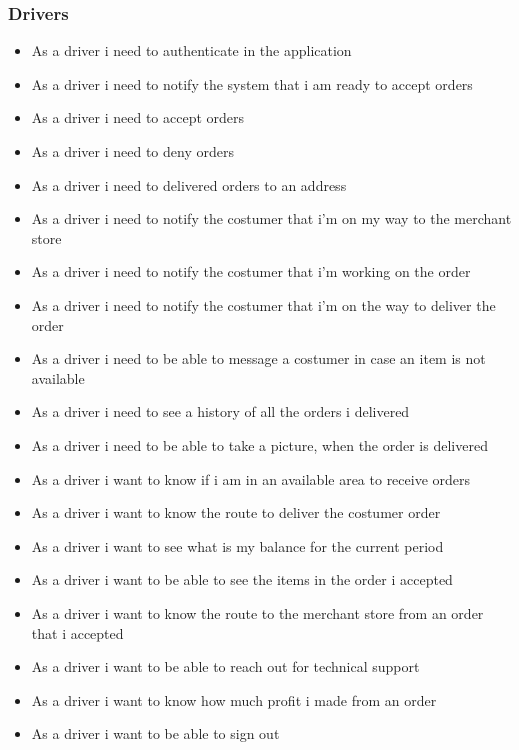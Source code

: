 \subsubsection{Drivers}
\begin{itemize}
    \item As a driver i need to authenticate in the application
    \item As a driver i need to notify the system that i am ready to 
    accept orders
    \item As a driver i need to accept orders
    \item As a driver i need to deny orders
    \item As a driver i need to delivered orders to an address
    \item As a driver i need to notify the costumer that i’m on my way to the 
    merchant store
    \item As a driver i need to notify the costumer that i’m working on the 
    order
    \item As a driver i need to notify the costumer that i’m on the way to 
    deliver the order
    \item As a driver i need to be able to message a costumer in case an 
    item is not available
    \item As a driver i need to see a history of all the orders i delivered
    \item As a driver i need to be able to take a picture, when the order is 
    delivered
    \item As a driver i want to know if i am in an available area to receive 
    orders
    \item As a driver i want to know the route to deliver the costumer order
    \item As a driver i want to see what is my balance for the current period
    \item As a driver i want to be able to see the items in the order i 
    accepted
    \item As a driver i want to know the route to the merchant store from an 
    order that i accepted
    \item As a driver i want to be able to reach out for technical support
    \item As a driver i want to know how much profit i made from an order
    \item As a driver i want to be able to sign out
\end{itemize}
\pagebreak
